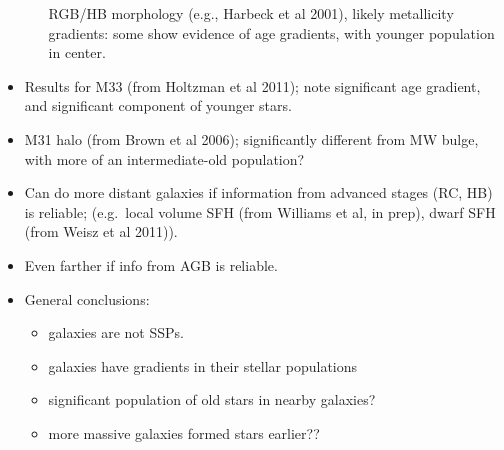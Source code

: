 \documentclass{article}
\begin{document}
\begin{itemize}
\begin{itemize}
                      RGB/HB morphology (e.g., Harbeck et al 2001), likely
                      metallicity gradients: some show evidence of age gradients,
                      with younger population in center.
              \end{itemize}
          \item Results for M33 (from Holtzman et al 2011); note significant age
              gradient, and significant component of younger stars.
          \item M31 halo (from Brown et al 2006); significantly different from
              MW bulge, with more of an intermediate-old population?
          \item Can do more distant galaxies if information from advanced stages
              (RC, HB) is reliable; (e.g.\ local volume SFH (from Williams et al,
              in prep), dwarf SFH (from Weisz et al 2011)).
          \item Even farther if info from AGB is reliable.
          \item General conclusions:
              \begin{itemize}
                  \item galaxies are not SSPs.
                  \item galaxies have gradients in their stellar populations
                  \item significant population of old stars in nearby galaxies?
                  \item more massive galaxies formed stars earlier??
              \end{itemize}
      \end{itemize}
\end{document}
